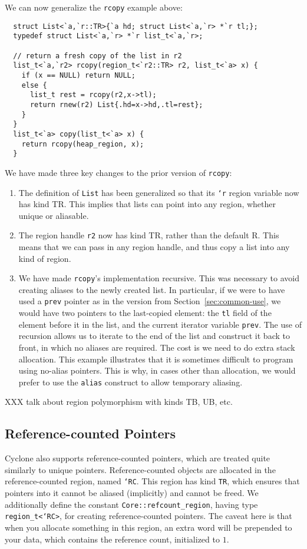 We can now generalize the \texttt{rcopy} example above:
\begin{verbatim}
  struct List<`a,`r::TR>{`a hd; struct List<`a,`r> *`r tl;};
  typedef struct List<`a,`r> *`r list_t<`a,`r>;

  // return a fresh copy of the list in r2
  list_t<`a,`r2> rcopy(region_t<`r2::TR> r2, list_t<`a> x) {
    if (x == NULL) return NULL;
    else {
      list_t rest = rcopy(r2,x->tl);
      return rnew(r2) List{.hd=x->hd,.tl=rest};
    }
  }
  list_t<`a> copy(list_t<`a> x) {
    return rcopy(heap_region, x);
  }
\end{verbatim}
We have made three key changes to the prior version of \texttt{rcopy}:
\begin{enumerate}
\item The definition of \texttt{List} has been generalized so that its
  \texttt{`r} region variable now has kind TR.  This implies that lists can
  point into any region, whether unique or aliasable.
\item The region handle \texttt{r2} now has kind TR, rather than the default
  R.  This means that we can pass in any region handle, and thus copy a list
  into any kind of region.
\item We have made \texttt{rcopy}'s implementation recursive.  This was
  necessary to avoid creating aliases to the newly created list.  In
  particular, if we were to have used a \texttt{prev} pointer as in the
  version from Section~\ref{sec:common-use}, we would have two pointers to
  the last-copied element: the \texttt{tl} field of the element before it in
  the list, and the current iterator variable \texttt{prev}.  The use of
  recursion allows us to iterate to the end of the list and construct it
  back to front, in which no aliases are required.  The cost is we need to
  do extra stack allocation.  This example illustrates that it is sometimes
  difficult to program using no-alias pointers.  This is why, in cases other
  than allocation, we would prefer to use the \texttt{alias} construct to
  allow temporary aliasing.
\end{enumerate}

XXX talk about region polymorphism with kinds TB, UB, etc.

\subsection{Reference-counted Pointers}

Cyclone also supports reference-counted pointers, which are treated quite
similarly to unique pointers.  Reference-counted objects are allocated in
the reference-counted region, named \texttt{`RC}. This region has kind
\texttt{TR}, which ensures that pointers into it cannot be aliased
(implicitly) and cannot be freed.  We additionally define the constant
\texttt{Core::refcount_region}, having type \texttt{region_t<`RC>}, for
creating reference-counted pointers.  The caveat here is that when you
allocate something in this region, an extra word will be prepended to your
data, which contains the reference count, initialized to $1$.

